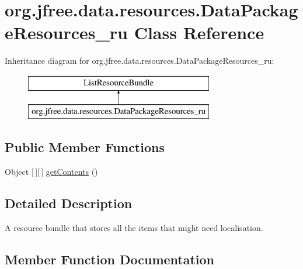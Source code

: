 \hypertarget{classorg_1_1jfree_1_1data_1_1resources_1_1_data_package_resources__ru}{}\section{org.\+jfree.\+data.\+resources.\+Data\+Package\+Resources\+\_\+ru Class Reference}
\label{classorg_1_1jfree_1_1data_1_1resources_1_1_data_package_resources__ru}
Inheritance diagram for org.\+jfree.\+data.\+resources.\+Data\+Package\+Resources\+\_\+ru\+:\begin{figure}[H]
\begin{center}
\leavevmode
\includegraphics[height=2.000000cm]{classorg_1_1jfree_1_1data_1_1resources_1_1_data_package_resources__ru}
\end{center}
\end{figure}
\subsection*{Public Member Functions}
\begin{DoxyCompactItemize}
\item 
Object \mbox{[}$\,$\mbox{]}\mbox{[}$\,$\mbox{]} \mbox{\hyperlink{classorg_1_1jfree_1_1data_1_1resources_1_1_data_package_resources__ru_a541110a35d2c298f4903e1979a5ed993}{get\+Contents}} ()
\end{DoxyCompactItemize}


\subsection{Detailed Description}
A resource bundle that stores all the items that might need localisation. 

\subsection{Member Function Documentation}
\mbox{\label{classorg_1_1jfree_1_1data_1_1resources_1_1_data_package_resources__ru_a541110a35d2c298f4903e1979a5ed993}} 
